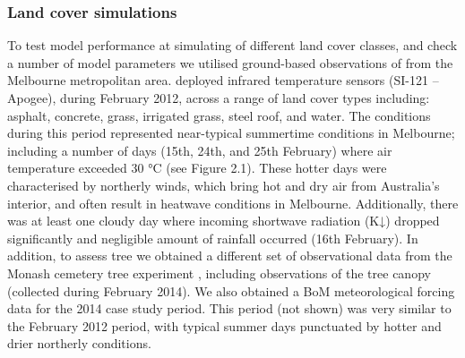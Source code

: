 \documentclass[final,3p,times,authoryear]{elsarticle}
\begin{document}
\subsubsection{Land cover simulations}\label{sec:landcoversim} 





To test model performance at simulating  of different land cover classes, and check a number of model parameters we utilised ground-based observations of  from the Melbourne metropolitan area. \cite{Coutts2016a} deployed infrared temperature sensors (SI-121 – Apogee), during February 2012, across a range of land cover types including: asphalt, concrete, grass, irrigated grass, steel roof, and water. The conditions during this period represented near-typical summertime conditions in Melbourne; including a number of days (15th, 24th, and 25th February) where air temperature exceeded 30 °C (see Figure 2.1). These hotter days were characterised by northerly winds, which bring hot and dry air from Australia's interior, and often result in heatwave conditions in Melbourne. Additionally, there was at least one cloudy day where incoming shortwave radiation (K↓) dropped significantly and negligible amount of rainfall occurred (16th February).  In addition, to assess tree  we obtained a different set of observational data from the Monash cemetery tree experiment \citep{Coutts2016b}, including  observations of the tree canopy (collected during February 2014). We also obtained a BoM meteorological forcing data for the 2014 case study period.  This period (not shown) was very similar to the February 2012 period, with typical summer days punctuated by hotter and drier northerly conditions. 
\end{document}
